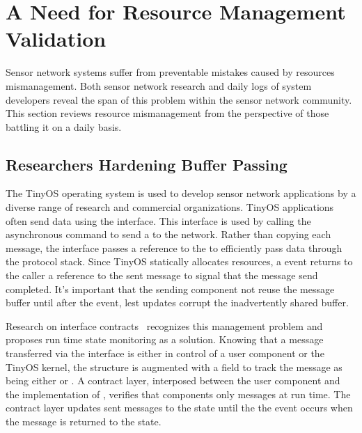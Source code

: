 \section{A Need for Resource Management Validation}


Sensor network systems suffer from preventable mistakes caused by resources
mismanagement.
%
Both sensor network research and daily logs of system developers reveal the
span of this problem within the sensor network community.
%
This section reviews resource mismanagement from the perspective of those
battling it on a daily basis.



\subsection{Researchers Hardening Buffer Passing}


The TinyOS operating system is used to develop sensor network applications by
a diverse range of research and commercial organizations.
%
TinyOS applications often send data using the  interface.
%
This interface is used by calling the asynchronous  command to
send a  to the network.
%
Rather than copying each message, the  interface passes a
reference to the  to efficiently pass data through the protocol
stack.
%
Since TinyOS statically allocates resources, a  event returns to
the caller a reference to the sent message to signal that the message send
completed.
%
It's important that the sending component not reuse the message buffer until
after the  event, lest updates corrupt the inadvertently shared
buffer.



Research on interface contracts~\cite{archer07interface} recognizes this
management problem and proposes run time state monitoring as a solution.
%
Knowing that a message transferred via the  interface is either in
control of a user component or the TinyOS kernel, the 
structure is augmented with a  field to track the message
as being either  or .
%
A contract layer, interposed between the user component and the implementation
of , verifies that components only   
messages at run time.
%
The contract layer updates sent messages to the  state until
the the  event occurs when the message is returned to the
 state.



